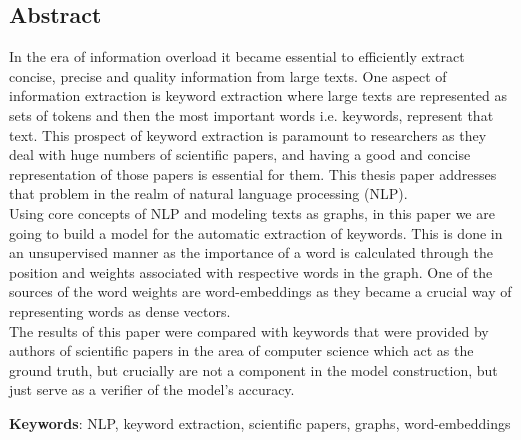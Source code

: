 \documentclass[12pt]{article}
\numberwithin{equation}{section}
\begin{document}
	\begin{spacing}{1.5}
	\section*{Abstract}
	In the era of information overload it became essential to efficiently extract concise, precise and quality information from large texts. One aspect of information extraction is keyword extraction where large texts are represented as sets of tokens and then the most important words i.e. keywords, represent that text. This prospect of keyword extraction is paramount to researchers as they deal with huge numbers of scientific papers, and having a good and concise representation of those papers is essential for them. This thesis paper addresses that problem in the realm of natural language processing (NLP). \\
	Using core concepts of NLP and modeling texts as graphs, in this paper we are going to build a model for the automatic extraction of keywords. This is done in an unsupervised manner as the importance of a word is calculated through the position and weights associated with respective words in the graph. One of the sources of the word weights are word-embeddings as they became a crucial way of representing words as dense vectors. \\
	The results of this paper were compared with keywords that were provided by authors of scientific papers in the area of computer science which act as the ground truth, but crucially are not a component in the model construction, but just serve as a verifier of the model's accuracy.
	
	\textbf{Keywords}: NLP, keyword extraction, scientific papers, graphs, word-embeddings
	
	\newpage
	\pagestyle{empty}
	\tableofcontents
	\setcounter{page}{0}
	\newpage
	\listoffigures
	\setcounter{page}{0}
	\pagebreak
	
	
	\newpage
	\pagestyle{fancy}

\end{spacing}
\end{document}
